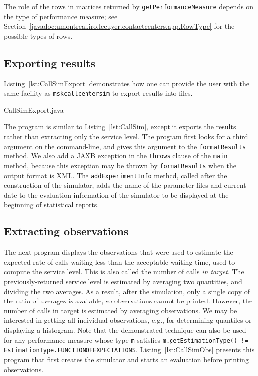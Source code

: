 The role of the rows in matrices returned by
\texttt{get\-Performance\-Measure} depends on the type of performance
measure;
see
Section~\ref{javadoc:umontreal.iro.lecuyer.contactcenters.app.RowType}
  for the possible types of rows.

\subsection{Exporting results}
\label{sec:export}

Listing~\ref{lst:CallSimExport} demonstrates how
one can provide the user with the same facility as
\texttt{mskcallcentersim} to export results into files.


{CallSimExport.java}

The program is similar to Listing~\ref{lst:CallSim}, except it exports
the results rather than extracting only the service level.
The program first looks for a third argument on the command-line, and
gives this argument to the \texttt{format\-Results} method.
We also add a JAXB exception in the \texttt{throws} clause of
the \texttt{main} method, because this exception may be thrown
by \texttt{format\-Results}
when the output format is XML.
The \texttt{add\-Experiment\-Info} method, called after the
construction of the simulator, adds the name of the parameter files
and current date to
the evaluation information of the simulator to
be displayed at the beginning of statistical reports.

\subsection{Extracting observations}
\label{sec:extobs}

The next program displays the observations that were used to
estimate the expected rate of calls waiting less than the
acceptable waiting time, used to compute the service level.
This is also called the number of calls \emph{in target}.
The previously-returned
service level is estimated by averaging two quantities, and dividing
the two averages.  As a result, after the simulation, only a single
copy of the ratio of averages is available, so observations cannot be
printed.  However, the number of calls in target is estimated by averaging
observations.  We may be interested in getting all individual
observations, e.g., for determining quantiles or displaying a
histogram.  Note that the demonstrated technique can also be used for
any performance measure whose type \texttt{m} satisfies
\texttt{m.getEstimationType() != EstimationType.FUNCTIONOFEXPECTATIONS}.
Listing~\ref{lst:CallSimObs} presents this program that first creates
the simulator and starts an evaluation before printing observations.

